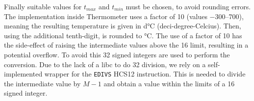 Finally suitable values for \(t_{max}\) and \(t_{min}\) must be chosen, to avoid rounding errors. The implementation inside Thermometer uses a factor of \num{10} (values \numrange{-300}{700}), meaning the resulting temperature is given in \si{\deci\degreeCelsius} (deci-degree-Celcius). Then, using the additional tenth-digit, is rounded to \si{\degreeCelsius}. The use of a factor of \num{10} has the side-effect of raising the intermediate values above the \SI{16}{\bit} limit, resulting in a potential overflow. To avoid this \SI{32}{\bit} signed integers are used to perform the conversion. Due to the lack of a libc to do \SI{32}{\bit} division, we rely on a self-implemented wrapper for the \texttt{EDIVS} HCS12 instruction. This is needed to divide the intermediate value by \(M - 1\) and obtain a value within the limits of a \SI{16}{\bit} signed integer.
